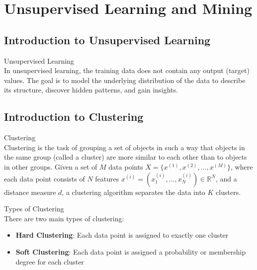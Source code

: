 \section{Unsupervised Learning and Mining}

\subsection{Introduction to Unsupervised Learning}

\begin{definition}{Unsupervised Learning}\\
In unsupervised learning, the training data does not contain any output (target) values. The goal is to model the underlying distribution of the data to describe its structure, discover hidden patterns, and gain insights.
\end{definition}

\subsection{Introduction to Clustering}

\begin{definition}{Clustering}\\
Clustering is the task of grouping a set of objects in such a way that objects in the same group (called a cluster) are more similar to each other than to objects in other groups. Given a set of $M$ data points $X = \{x^{(1)}, x^{(2)}, \ldots, x^{(M)}\}$, where each data point consists of $N$ features $x^{(i)} = (x^{(i)}_1, \ldots, x^{(i)}_N) \in \mathbb{R}^N$, and a distance measure $d$, a clustering algorithm separates the data into $K$ clusters.
\end{definition}

\begin{concept}{Types of Clustering}\\
There are two main types of clustering:
\begin{itemize}
    \item \textbf{Hard Clustering}: Each data point is assigned to exactly one cluster
    \item \textbf{Soft Clustering}: Each data point is assigned a probability or membership degree for each cluster
\end{itemize}
\end{concept}


